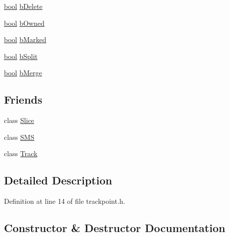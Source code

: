 \begin{DoxyCompactItemize}
\item 
\hyperlink{mac_2config_2i386_2lib-src_2libsoxr_2soxr-config_8h_abb452686968e48b67397da5f97445f5b}{bool} \hyperlink{class__sbsms___1_1_track_point_a6275318f8997b972261a28f14c6d41b0}{b\+Delete}
\item 
\hyperlink{mac_2config_2i386_2lib-src_2libsoxr_2soxr-config_8h_abb452686968e48b67397da5f97445f5b}{bool} \hyperlink{class__sbsms___1_1_track_point_aa60ebe0f80d7033d1bf1ed3c8817f8d5}{b\+Owned}
\item 
\hyperlink{mac_2config_2i386_2lib-src_2libsoxr_2soxr-config_8h_abb452686968e48b67397da5f97445f5b}{bool} \hyperlink{class__sbsms___1_1_track_point_aed73ed677786bcc061c242693e2ae634}{b\+Marked}
\item 
\hyperlink{mac_2config_2i386_2lib-src_2libsoxr_2soxr-config_8h_abb452686968e48b67397da5f97445f5b}{bool} \hyperlink{class__sbsms___1_1_track_point_a5b46d8f3bde3f3cb5bce87b282da3783}{b\+Split}
\item 
\hyperlink{mac_2config_2i386_2lib-src_2libsoxr_2soxr-config_8h_abb452686968e48b67397da5f97445f5b}{bool} \hyperlink{class__sbsms___1_1_track_point_ac01652a5fefbbf9367f5b1f03f34092e}{b\+Merge}
\end{DoxyCompactItemize}
\subsection*{Friends}
\begin{DoxyCompactItemize}
\item 
class \hyperlink{class__sbsms___1_1_track_point_af5899f89d7315d134ff0078c9fade832}{Slice}
\item 
class \hyperlink{class__sbsms___1_1_track_point_ae2e50c4e133202e0676be10c4db4f039}{S\+MS}
\item 
class \hyperlink{class__sbsms___1_1_track_point_ac9187679244c6a3414c63aae65f83a2e}{Track}
\end{DoxyCompactItemize}


\subsection{Detailed Description}


Definition at line 14 of file trackpoint.\+h.



\subsection{Constructor \& Destructor Documentation}
